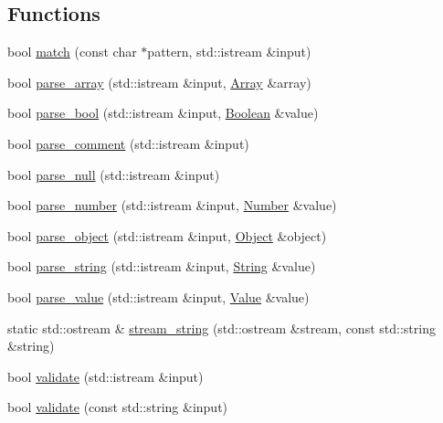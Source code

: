 \subsection*{Functions}
\begin{DoxyCompactItemize}
\item 
bool \hyperlink{namespacejsonxx_ae776e5d149f1fb6a6d163e408852b137}{match} (const char $\ast$pattern, std\+::istream \&input)
\item 
bool \hyperlink{namespacejsonxx_afb393bd02ef1b837516397516ee416ae}{parse\+\_\+array} (std\+::istream \&input, \hyperlink{classjsonxx_1_1_array}{Array} \&array)
\item 
bool \hyperlink{namespacejsonxx_afef9054b57f3210e902bda013f95d8be}{parse\+\_\+bool} (std\+::istream \&input, \hyperlink{namespacejsonxx_aa700abaa02dfd30f2a09ba8e95c6f3eb}{Boolean} \&value)
\item 
bool \hyperlink{namespacejsonxx_ab4ffd62078e6c7430529cfd2301828f0}{parse\+\_\+comment} (std\+::istream \&input)
\item 
bool \hyperlink{namespacejsonxx_a07030da60583d46e35328e3941829ef8}{parse\+\_\+null} (std\+::istream \&input)
\item 
bool \hyperlink{namespacejsonxx_abcab6b81755711428a41e855d9cb6f25}{parse\+\_\+number} (std\+::istream \&input, \hyperlink{namespacejsonxx_a189d79e326066a8e082664e4062f3fc8}{Number} \&value)
\item 
bool \hyperlink{namespacejsonxx_a521422be00aceffe398c1e48b1252318}{parse\+\_\+object} (std\+::istream \&input, \hyperlink{classjsonxx_1_1_object}{Object} \&object)
\item 
bool \hyperlink{namespacejsonxx_acb41195107e0cb6601b35dc25c5d9ad8}{parse\+\_\+string} (std\+::istream \&input, \hyperlink{namespacejsonxx_a29c7a7494bb75c227bdbd208dc80a09f}{String} \&value)
\item 
bool \hyperlink{namespacejsonxx_a7ac101d3ef10de8b73255e28de88910c}{parse\+\_\+value} (std\+::istream \&input, \hyperlink{classjsonxx_1_1_value}{Value} \&value)
\item 
static std\+::ostream \& \hyperlink{namespacejsonxx_a052e51dfd73ecb2692230a6a971276dc}{stream\+\_\+string} (std\+::ostream \&stream, const std\+::string \&string)
\item 
bool \hyperlink{namespacejsonxx_ae30e583f921cbc3ee02ac75b4ce2b3d6}{validate} (std\+::istream \&input)
\item 
bool \hyperlink{namespacejsonxx_a5ac22dfe00ed350dc9f05a2083d4c13e}{validate} (const std\+::string \&input)
\item 

\end{DoxyCompactItemize}
